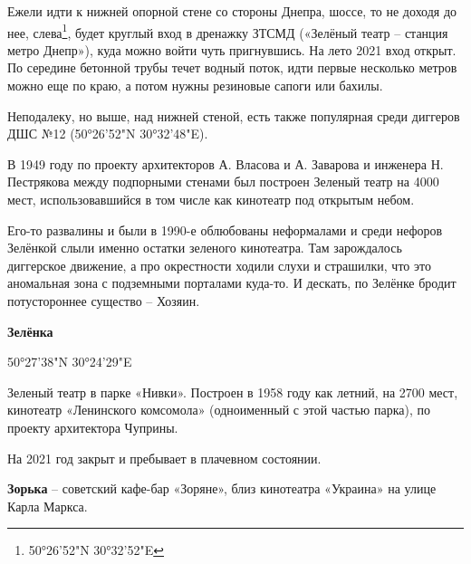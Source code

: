 Ежели идти к нижней опорной стене со стороны Днепра, шоссе, то не доходя до нее, слева\footnote{ 50°26'52"N 30°32'52"E}, будет круглый вход в дренажку ЗТСМД («Зелёный театр – станция метро Днепр»), куда можно войти чуть пригнувшись. На лето 2021 вход открыт. По середине бетонной трубы течет водный поток, идти первые несколько метров можно еще по краю, а потом нужны резиновые сапоги или бахилы.

Неподалеку, но выше, над нижней стеной, есть также популярная среди диггеров ДШС №12 (50°26'52"N 30°32'48"E).

В 1949 году по проекту архитекторов А. Власова и А. Заварова и инженера Н. Пестрякова между подпорными стенами был построен Зеленый театр на 4000 мест, использовавшийся в том числе как кинотеатр под открытым небом.

Его-то развалины и были в 1990-е облюбованы неформалами и среди нефоров Зелёнкой слыли именно остатки зеленого кинотеатра. Там зарождалось диггерское движение, а про окрестности ходили слухи и страшилки, что это аномальная зона с подземными порталами куда-то. И дескать, по Зелёнке бродит потустороннее существо – Хозяин.\\


\medskip

\textbf{Зелёнка}

50°27'38"N 30°24'29"E

Зеленый театр в парке «Нивки». Построен в 1958 году как летний, на 2700 мест, кинотеатр «Ленинского комсомола» (одноименный с этой частью парка), по проекту архитектора Чуприны.

На 2021 год закрыт и пребывает в плачевном состоянии.\\

\medskip

\textbf{Зорька} – советский кафе-бар «Зоряне», близ кинотеатра «Украина» на улице Карла Маркса.\\